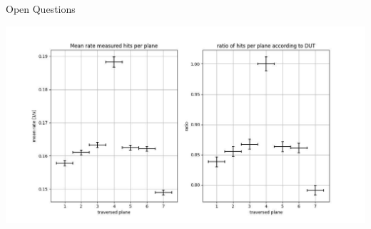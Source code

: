 \documentclass{beamer}
\begin{document}
\begin{frame}{Open Questions}
\begin{minipage}{.24\textwidth}
	    \includegraphics[trim=430 0 0 0, clip,width=.8\textwidth]{DavidFirstEff.jpg} \\[2.5cm]
    \end{minipage}
\end{frame}
\end{document}
